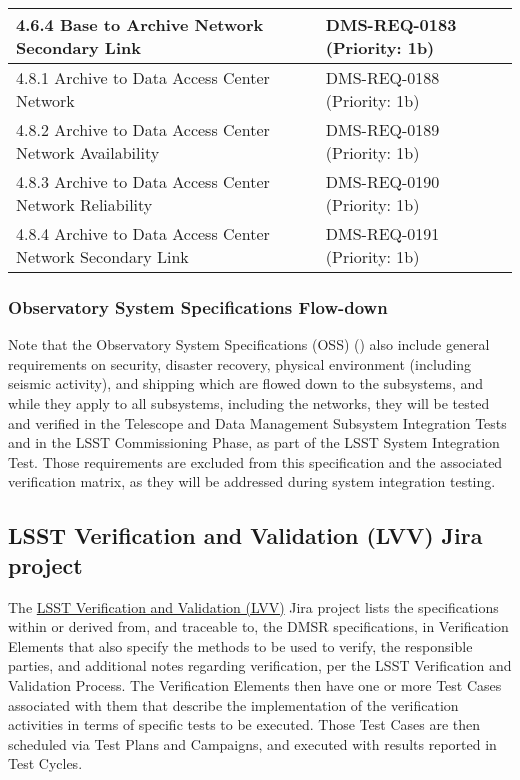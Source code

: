 \documentclass[DM,lsstdraft,STS,toc]{lsstdoc}
\begin{document}
\begin{center}
\begin{tabular}{|l|l|}
    4.6.4 Base to Archive Network Secondary Link                & DMS-REQ-0183 (Priority: 1b) \\ \hline
    4.8.1 Archive to Data Access Center Network                 & DMS-REQ-0188 (Priority: 1b) \\ \hline
    4.8.2 Archive to Data Access Center Network Availability    & DMS-REQ-0189 (Priority: 1b) \\ \hline
    4.8.3 Archive to Data Access Center Network Reliability     & DMS-REQ-0190 (Priority: 1b) \\ \hline
    4.8.4 Archive to Data Access Center Network Secondary Link  & DMS-REQ-0191 (Priority: 1b) \\ \hline
\end{tabular}
\end{center}

\subsubsection{Observatory System Specifications Flow-down}\label{sec:ossflowd}

Note that the Observatory System Specifications (OSS) () also include general requirements on security, disaster recovery, physical environment (including seismic activity), and shipping which are flowed down to the subsystems, and while they apply to all subsystems, including the networks, they will be tested and verified in the Telescope and Data Management Subsystem Integration Tests and in the LSST Commissioning Phase, as part of the LSST System Integration Test.
Those requirements are excluded from this specification and the associated verification matrix, as they will be addressed during system integration testing.

\subsection{LSST Verification and Validation (LVV) Jira project}\label{sec:lvv}

The \href{https://jira.lsstcorp.org/projects/LVV/}{LSST Verification and Validation (LVV)} Jira project lists the specifications within or derived from, and traceable to, the DMSR specifications, in Verification Elements that also specify the methods to be used to verify, the responsible parties, and additional notes regarding verification, per the  LSST Verification and Validation Process.
The Verification Elements then have one or more Test Cases associated with them that describe the implementation of the verification activities in terms of specific tests to be executed.
Those Test Cases are then scheduled via Test Plans and Campaigns, and executed with results reported in Test Cycles.
\end{document}
